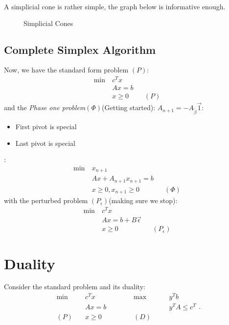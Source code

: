 A simplicial cone is rather simple, the graph below is informative enough.
\begin{figure}[H]
	\centering
	\caption{Simplicial Cones}
	\label{fig:simplicial-cones}
\end{figure}

\subsection{Complete Simplex Algorithm}
Now, we have the standard form problem \((P)\):
\begin{align*}
	\min~ & c^Tx             \\
	      & Ax = b           \\
	      & x\geq 0 &  & (P)
\end{align*}
and the \emph{Phase one problem}\((\Phi)\)(Getting started):
\(A_{n+1} = -A_{\widetilde{\beta}}\vec{1}\):
\begin{itemize}
	\item First pivot is special
	\item Last pivot is special
\end{itemize}:
\begin{align*}
	\min~ & x_{n+1}                            \\
	      & Ax +A_{n+1} x_{n+1}= b             \\
	      & x\geq 0, x_{n+1}\geq 0 &  & (\Phi)
\end{align*}
with the perturbed problem \((P_{\epsilon})\)(making sure we stop):
\begin{align*}
	\min~ & c^Tx                                          \\
	      & Ax = b + B \vec{\epsilon}                     \\
	      & x\geq 0                   &  & (P_{\epsilon})
\end{align*}

\section{Duality}
Consider the standard problem and its duality:
\[
	\begin{alignedat}{5}
		\min~&c^{T}x\qquad\qquad &&\max ~ &&y^{T}b\\
		&Ax = b && &&y^{T}A\leq c^{T}\\
		(P)\quad&x\geq  0 &&(D)\quad&&
	\end{alignedat}.
\]

